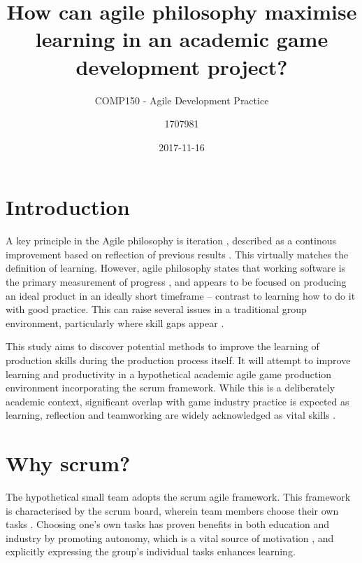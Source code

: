 \documentclass{scrartcl}
\title{How can agile philosophy maximise learning in an academic game development project?}
\subtitle{COMP150 - Agile Development Practice}
\date{2017-11-16}
\author{1707981}
\begin{document}
\maketitle
{}



\section{Introduction}
A key principle in the Agile philosophy is iteration \cite{agile}, described as a continous improvement based on reflection of previous results \cite{iteration}. This virtually matches the definition of learning. However, agile philosophy states that working software is the primary measurement of progress \cite{manifesto}, and appears to be focused on producing an ideal product in an ideally short timeframe -- contrast to learning how to do it with good practice. This can raise several issues in a traditional group environment, particularly where skill gaps appear \cite{group2003}.

This study aims to discover potential methods to improve the learning of production skills during the production process itself. It will attempt to improve learning and productivity in a hypothetical academic agile game production environment incorporating the scrum framework. While this is a deliberately academic context, significant overlap with game industry practice is expected as learning, reflection and teamworking are widely acknowledged as vital skills \cite{collaboration, devstudy}.


\section{Why scrum?}
The hypothetical small team adopts the scrum agile framework. This framework is characterised by the scrum board, wherein team members choose their own tasks \cite{scrum}. Choosing one's own tasks has proven benefits in both education and industry by promoting autonomy, which is a vital source of motivation \cite{motivation}, and explicitly expressing the group's individual tasks enhances learning. \cite{group2005}
\end{document}
